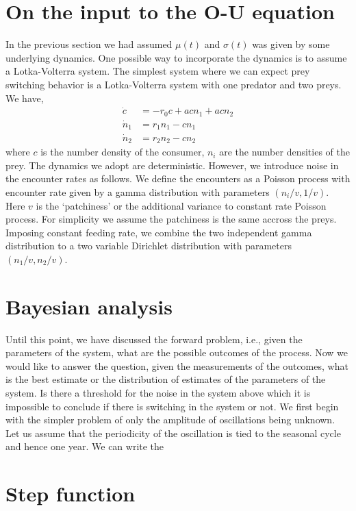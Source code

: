 \documentclass[12pt]{iopart}
\begin{document}
\section{On the input to the O-U equation}
In the previous section we had assumed $\mu(t)$ and $\sigma(t)$ was given by some underlying dynamics. One possible way to incorporate the dynamics is to assume a Lotka-Volterra system. The simplest system where we can expect prey switching behavior is a Lotka-Volterra system with one predator and two preys. We have,
\begin{align}
\label{Lotka-Volterra-system}
\dot{c} &= -r_0 c + a c n_1 + a c n_2 \nonumber \\
\dot{n}_1 &= r_1 n_1 - c n_1 \nonumber \\
\dot{n}_2 &= r_2 n_2 - c n_2
\end{align}
where $c$ is the number density of the consumer, $n_i$ are the number densities of the prey. The dynamics we adopt are deterministic. However, we introduce noise in the encounter rates as follows. We define the encounters as a Poisson process with encounter rate given by a gamma distribution with parameters $(n_i/v, 1/v)$. Here $v$ is the `patchiness' or the additional variance to constant rate Poisson process. For simplicity we assume the patchiness is the same accross the preys. Imposing constant feeding rate, we combine the two independent gamma distribution to a two variable Dirichlet distribution with parameters $(n_1/v, n_2/v)$.


\section{Bayesian analysis}
Until this point, we have discussed the forward problem, i.e., given the parameters of the system, what are the possible outcomes of the process. Now we would like to answer the question, given the measurements of the outcomes, what is the best estimate or the distribution of estimates of the parameters of the system. Is there a threshold for the noise in the system above which it is impossible to conclude if there is switching in the system or not. We first begin with the simpler problem of only the amplitude of oscillations being unknown. Let us assume that the periodicity of the oscillation is tied to the seasonal cycle and hence one year.
We can write the


\section{Step function}
\end{document}
